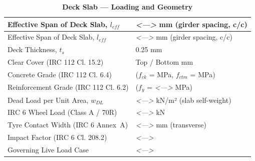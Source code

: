 \documentclass[12pt,a4paper]{report}
\numberwithin{table}{chapter}
\numberwithin{figure}{chapter}
\newcommand{\placeholder}[1]{\textit{\textless #1\textgreater}}
\begin{document}
\vspace{1em}
\begin{longtable}{|L{5.5cm}|p{10.0cm}|}
\caption{\textbf{Deck Slab --- Loading and Geometry}}
\hline
{} \textnormal{Effective Span of Deck Slab, $l_{eff}$} & \placeholder{---} mm (girder spacing, c/c) \\[6pt]
\hline
\endfirsthead
\hline
{} \textnormal{Effective Span of Deck Slab, $l_{eff}$} & \placeholder{---} mm (girder spacing, c/c) \\[6pt]
\hline
\endhead
\textnormal{Deck Thickness, $t_s$} & 0.25 mm \\[6pt]
\hline
\textnormal{Clear Cover (IRC 112 Cl. 15.2)} & Top  / Bottom  mm \\[6pt]
\hline
\textnormal{Concrete Grade (IRC 112 Cl. 6.4)} &  ($f_{ck}$ =  MPa, $f_{ctm}$ =  MPa) \\[6pt]
\hline
\textnormal{Reinforcement Grade (IRC 112 Cl. 6.2)} &  ($f_y$ = \placeholder{---} MPa) \\[6pt]
\hline
\textnormal{Dead Load per Unit Area, $w_{DL}$} & \placeholder{---} kN/m² (slab self-weight) \\[6pt]
\hline
\textnormal{IRC 6 Wheel Load (Class A / 70R)} & \placeholder{---} kN \\[6pt]
\hline
\textnormal{Tyre Contact Width (IRC 6 Annex~A)} & \placeholder{---} mm (transverse) \\[6pt]
\hline
\textnormal{Impact Factor (IRC 6 Cl. 208.2)} & \placeholder{---} \\[6pt]
\hline
\textnormal{Governing Live Load Case} & \placeholder{---} \\[6pt]
\hline
\end{longtable}
\end{document}
